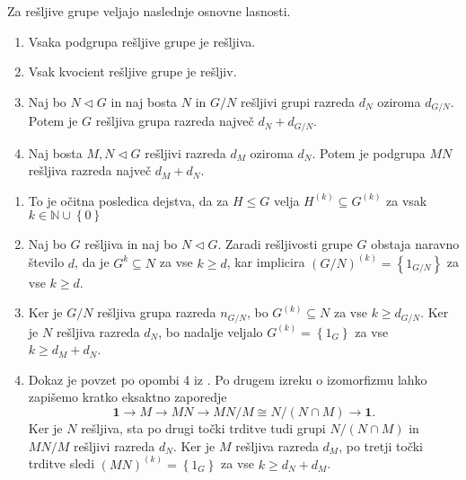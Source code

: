 \documentclass[mat1, tisk]{fmfdelo}
\numberwithin{equation}{section}  %
\begin{document}
    Za rešljive grupe veljajo naslednje osnovne lasnosti.
    
    \begin{trditev}
    \label{trd_lastnosti_resljivih_grup}
     \begin{enumerate}
        \item Vsaka podgrupa rešljive grupe je rešljiva.
        \item Vsak kvocient rešljive grupe je rešljiv.
        \item Naj bo $N \triangleleft G$ in naj bosta $N$ in $G / N$ rešljivi grupi razreda $d_{N}$ oziroma $d_{G / N}$. Potem je $G$ rešljiva grupa razreda največ $d_N + d_{G / N}$.
        \item Naj bosta $M, N \triangleleft G$ rešljivi razreda $d_M$ oziroma $d_N$. Potem je podgrupa $MN$ rešljiva razreda največ $d_M + d_N$.   
     \end{enumerate}
    \end{trditev}
    \begin{dokaz}
        \begin{enumerate}
            \item To je očitna posledica dejstva, da za $H \le G$ velja $H^{(k)} \subseteq G^{(k)}$ za vsak $k \in \mathbb{N} \cup \left\{ 0\right\} $
            \item Naj bo $G$ rešljiva in naj bo $N \triangleleft G$. Zaradi rešljivosti grupe $G$ obstaja naravno število $d$, da je $G^{k} \subseteq N$ za vse $k \ge d$, kar implicira $ (G / N)^{(k)} = \left\{ 1_{G / N}\right\}$ za vse $k \ge d$. 
            \item Ker je $G / N$ rešljiva grupa razreda $n_{G / N}$, bo $G^{(k)} \subseteq N$ za vse $k \ge d_{G / N}$. Ker je $N$ rešljiva razreda $d_N$, bo nadalje veljalo $G^{(k)} = \left\{ 1_G\right\}$ za vse $k \ge d_M + d_N$.
            \item Dokaz je povzet po opombi 4 iz \cite[str.4]{Schneider_2016}. Po drugem izreku o izomorfizmu lahko zapišemo kratko eksaktno zaporedje \begin{equation*}
            \mathbf{1} \to M \to MN \to MN / M \cong N / (N \cap M) \to \mathbf{1}.
            \end{equation*}  
            Ker je $N$ rešljiva, sta po drugi točki trditve tudi grupi $ N / (N \cap M)$ in $ MN / M $ rešljivi razreda $d_N$. Ker je $M$ rešljiva razreda $d_M$, po tretji točki trditve sledi $(MN)^{(k)} = \left\{ 1_{G}\right\}$ za vse $k \ge d_N + d_M$.
        \end{enumerate}
    \end{dokaz}
\end{document}

